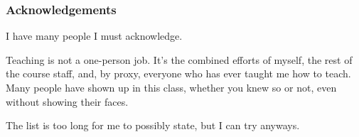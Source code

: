\documentclass[aspectratio=169, handout]{beamer}
\begin{document}

\begin{frame}[fragile]
  \frametitle{Acknowledgements}

  I have many people I must acknowledge.

  \pause
  \vspace{\fill}

  Teaching is not a one-person job. It's the combined efforts of myself, the
  rest of the course staff, and, by proxy, everyone who has ever taught me
  how to teach. Many people have shown up in this class, whether you knew so
  or not, even without showing their faces.

  \pause
  \vspace{\fill}

  The list is too long for me to possibly state, but I can try anyways.
\end{frame}
\end{document}
